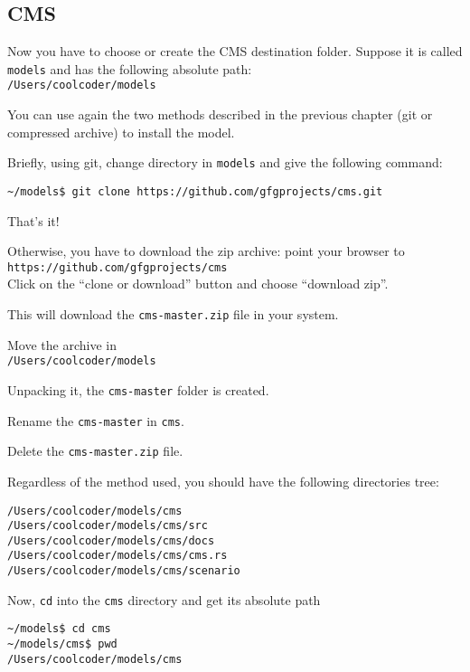 \documentclass{article}
\begin{document}
\subsection{CMS}

Now you have to choose or create the CMS destination folder.
Suppose it is called \verb+models+ and has the following absolute path: \\
\verb+/Users/coolcoder/models+

You can use again the two methods described in the previous chapter (git or compressed archive) to install the model. 

Briefly, using git, change directory in \verb+models+ and give the following command:

\vskip2mm
\noindent\verb+~/models$ +\color{red}\verb+git clone https://github.com/gfgprojects/cms.git+ \color{black}

\vskip2mm
That's it!

Otherwise, you have to download the zip archive: point your browser to\\ 
\verb+https://github.com/gfgprojects/cms+\\
Click on the ``clone or download'' button and choose ``download zip''.

This will download the \verb+cms-master.zip+ file in your system.

Move the archive in\\
\verb+/Users/coolcoder/models+

Unpacking it, the \verb+cms-master+ folder is created.

Rename the \verb+cms-master+ in \verb+cms+.

Delete the \verb+cms-master.zip+ file.

\vskip1cm
Regardless of the method used, you should have the following directories tree: 

\begin{verbatim}
/Users/coolcoder/models/cms
/Users/coolcoder/models/cms/src
/Users/coolcoder/models/cms/docs
/Users/coolcoder/models/cms/cms.rs
/Users/coolcoder/models/cms/scenario
\end{verbatim}

Now, \verb+cd+ into the \verb+cms+ directory and get its absolute path  



\vskip2mm
\noindent\verb+~/models$ +\color{red}\verb+cd cms+ \color{black}\\
\verb+~/models/cms$ +\color{red}\verb+pwd+ \color{blue}\\
\verb+/Users/coolcoder/models/cms+
\color{black}
\vskip2mm
\end{document}
